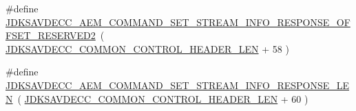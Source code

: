 \begin{DoxyCompactItemize}
\item 
\#define \hyperlink{group__command__set__stream__info__response_gad047935f0e0d99eb42e053cf62859238}{J\+D\+K\+S\+A\+V\+D\+E\+C\+C\+\_\+\+A\+E\+M\+\_\+\+C\+O\+M\+M\+A\+N\+D\+\_\+\+S\+E\+T\+\_\+\+S\+T\+R\+E\+A\+M\+\_\+\+I\+N\+F\+O\+\_\+\+R\+E\+S\+P\+O\+N\+S\+E\+\_\+\+O\+F\+F\+S\+E\+T\+\_\+\+R\+E\+S\+E\+R\+V\+E\+D2}~( \hyperlink{group__jdksavdecc__avtp__common__control__header_gaae84052886fb1bb42f3bc5f85b741dff}{J\+D\+K\+S\+A\+V\+D\+E\+C\+C\+\_\+\+C\+O\+M\+M\+O\+N\+\_\+\+C\+O\+N\+T\+R\+O\+L\+\_\+\+H\+E\+A\+D\+E\+R\+\_\+\+L\+EN} + 58 )
\item 
\#define \hyperlink{group__command__set__stream__info__response_gaebff86b0d3ebae556fa3978476aafbf3}{J\+D\+K\+S\+A\+V\+D\+E\+C\+C\+\_\+\+A\+E\+M\+\_\+\+C\+O\+M\+M\+A\+N\+D\+\_\+\+S\+E\+T\+\_\+\+S\+T\+R\+E\+A\+M\+\_\+\+I\+N\+F\+O\+\_\+\+R\+E\+S\+P\+O\+N\+S\+E\+\_\+\+L\+EN}~( \hyperlink{group__jdksavdecc__avtp__common__control__header_gaae84052886fb1bb42f3bc5f85b741dff}{J\+D\+K\+S\+A\+V\+D\+E\+C\+C\+\_\+\+C\+O\+M\+M\+O\+N\+\_\+\+C\+O\+N\+T\+R\+O\+L\+\_\+\+H\+E\+A\+D\+E\+R\+\_\+\+L\+EN} + 60 )
\end{DoxyCompactItemize}
